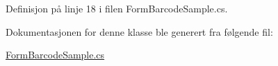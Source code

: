 Definisjon på linje 18 i filen Form\+Barcode\+Sample.\+cs.



Dokumentasjonen for denne klasse ble generert fra følgende fil\+:\begin{DoxyCompactItemize}
\item 
\hyperlink{_form_barcode_sample_8cs}{Form\+Barcode\+Sample.\+cs}\end{DoxyCompactItemize}
